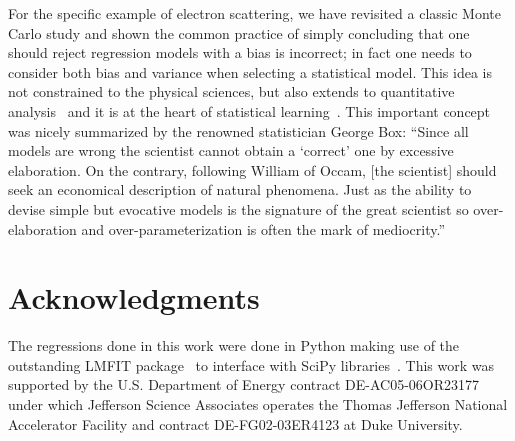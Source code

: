 \documentclass[10pt,aps,prc,twocolumn]{revtex4-1}
\begin{document}
For the specific example of electron scattering, we have revisited a classic Monte Carlo study and shown
the common practice of simply concluding that one should reject regression models with a bias is incorrect; 
in fact one needs to consider both bias and variance when selecting a statistical model.   
This idea is not constrained to the physical sciences, but also extends 
to quantitative analysis~\cite{Brighton:2015} and it is at the heart of statistical 
learning~\cite{Hastie:2009}.
This important concept was nicely summarized by the renowned statistician George Box: 
``Since all models are wrong the scientist cannot obtain a `correct' one
by excessive elaboration.  On the contrary, following William of Occam, 
[the scientist] should seek an economical description of natural phenomena. 
Just as the ability to devise simple but evocative models is the signature of the
great scientist so over-elaboration and over-parameterization is often
the mark of mediocrity.''~\cite{Box76}


\section{Acknowledgments}

The regressions done in this work were done in Python making use of the
outstanding LMFIT package~\cite{Newville:2014} to interface with SciPy
libraries~\cite{Jones:2001}.
This work was supported by the U.S.  Department of Energy contract DE-AC05-06OR23177
under which Jefferson Science Associates operates the Thomas Jefferson National 
Accelerator Facility and contract DE-FG02-03ER4123 at Duke University.


\end{document}
